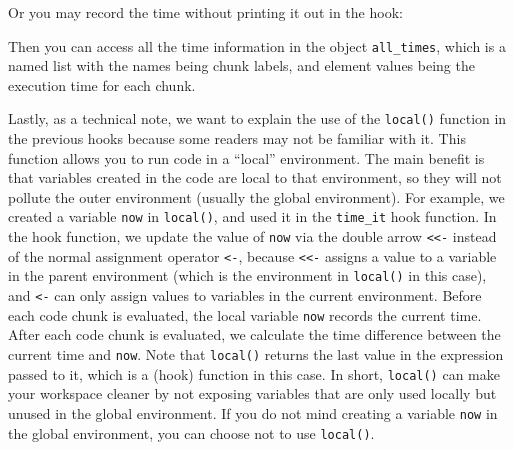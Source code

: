 \documentclass[
  11pt,
]{krantz}
\newenvironment{Shaded}{\begin{snugshade}}{\end{snugshade}}
\newcommand{\CommentTok}[1]{\textcolor[rgb]{0.37,0.37,0.37}{\textit{#1}}}
\newcommand{\ControlFlowTok}[1]{\textcolor[rgb]{0.27,0.27,0.27}{\textbf{#1}}}
\newcommand{\DataTypeTok}[1]{\textcolor[rgb]{0.27,0.27,0.27}{#1}}
\newcommand{\KeywordTok}[1]{\textcolor[rgb]{0.27,0.27,0.27}{\textbf{#1}}}
\newcommand{\NormalTok}[1]{#1}
\newcommand{\OperatorTok}[1]{\textcolor[rgb]{0.43,0.43,0.43}{\textbf{#1}}}
\newcommand{\OtherTok}[1]{\textcolor[rgb]{0.37,0.37,0.37}{#1}}
\newcommand{\StringTok}[1]{\textcolor[rgb]{0.5,0.5,0.5}{#1}}
\begin{document}
Or you may record the time without printing it out in the hook:

\begin{Shaded}
\end{Shaded}

Then you can access all the time information in the object \texttt{all\_times}, which is a named list with the names being chunk labels, and element values being the execution time for each chunk.

Lastly, as a technical note, we want to explain the use of the \texttt{local()} function in the previous hooks because some readers may not be familiar with it. This function allows you to run code in a ``local'' environment. The main benefit is that variables created in the code are local to that environment, so they will not pollute the outer environment (usually the global environment). For example, we created a variable \texttt{now} in \texttt{local()}, and used it in the \texttt{time\_it} hook function. In the hook function, we update the value of \texttt{now} via the double arrow \texttt{\textless{}\textless{}-} instead of the normal assignment operator \texttt{\textless{}-}, because \texttt{\textless{}\textless{}-} assigns a value to a variable in the parent environment (which is the environment in \texttt{local()} in this case), and \texttt{\textless{}-} can only assign values to variables in the current environment. Before each code chunk is evaluated, the local variable \texttt{now} records the current time. After each code chunk is evaluated, we calculate the time difference between the current time and \texttt{now}. Note that \texttt{local()} returns the last value in the expression passed to it, which is a (hook) function in this case. In short, \texttt{local()} can make your workspace cleaner by not exposing variables that are only used locally but unused in the global environment. If you do not mind creating a variable \texttt{now} in the global environment, you can choose not to use \texttt{local()}.
\end{document}
